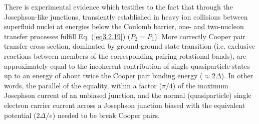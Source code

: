 \begin{subappendices}
There is experimental evidence which testifies to the fact that through the Josephson-like junctions, transiently established in heavy ion collisions between superfluid nuclei at energies below the Coulomb barrier, one- and two-nucleon transfer processes fulfill Eq. (\ref{eq3.2.19}) ($P_2=P_1$). More correctly Cooper pair transfer cross section, dominated by ground-ground state transition (i.e. exclusive reactions between members of the corresponding pairing rotational bands), are approximately equal to the incoherent contribution of single quasiparticle states up to an energy of about twice the Cooper pair binding energy ($\approx2\Delta$). In other words, the parallel of the equality, within a factor ($\pi/4$) of the maximum Josephson current of an unbiased junction, and the normal (quasiparticle) single electron carrier current across a Josephson junction biased with the equivalent potential ($2\Delta/e$) needed to be break Cooper pairs.  

\end{subappendices}
